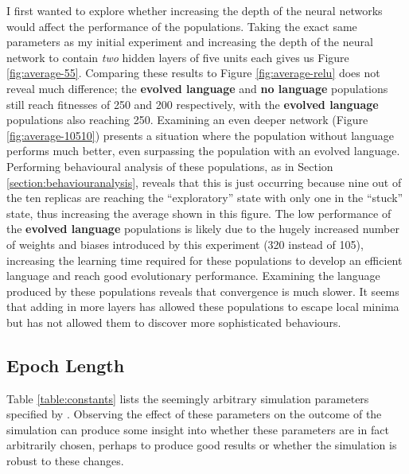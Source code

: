 \documentclass[12pt,a4paper]{report}
\begin{document}
I first wanted to explore whether increasing the depth of the neural networks would affect the performance of the populations. Taking the exact same parameters as my initial experiment and increasing the depth of the neural network to contain \emph{two} hidden layers of five units each gives us Figure \ref{fig:average-55}. Comparing these results to Figure \ref{fig:average-relu} does not reveal much difference; the {\bf evolved language} and {\bf no language} populations still reach fitnesses of 250 and 200 respectively, with the {\bf evolved language} populations also reaching 250. Examining an even deeper network (Figure \ref{fig:average-10510}) presents a situation where the population without language performs much better, even surpassing the population with an evolved language. Performing behavioural analysis of these populations, as in Section \ref{section:behaviouranalysis}, reveals that this is just occurring because nine out of the ten replicas are reaching the ``exploratory'' state with only one in the ``stuck'' state, thus increasing the average shown in this figure. The low performance of the {\bf evolved language} populations is likely due to the hugely increased number of weights and biases introduced by this experiment (320 instead of 105), increasing the learning time required for these populations to develop an efficient language and reach good evolutionary performance. Examining the language produced by these populations reveals that convergence is much slower. It seems that adding in more layers has allowed these populations to escape local minima but has not allowed them to discover more sophisticated behaviours.

\subsection{Epoch Length}

Table \ref{table:constants} lists the seemingly arbitrary simulation parameters specified by \citet{Cangelosi1998}. Observing the effect of these parameters on the outcome of the simulation can produce some insight into whether these parameters are in fact arbitrarily chosen, perhaps to produce good results or whether the simulation is robust to these changes.
\end{document}
